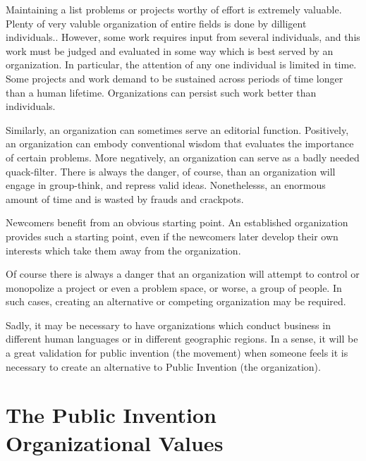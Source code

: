 \documentclass[
	fontsize=10pt, %
	twoside=false, %
	secnumdepth=1, %
]{kaobook}
\begin{document}
Maintaining a list problems or projects worthy of effort is extremely valuable.
Plenty of very valuble organization of entire fields is done by dilligent individuals..
However, some work requires input from several individuals, and this work must be judged and evaluated
in some way which is best served by an organization.
In particular, the attention of any one
individual is limited in time.
Some projects and work demand to be sustained across periods of time longer than a human lifetime.
Organizations can persist such work better than individuals.

Similarly, an organization can sometimes serve an editorial function.
Positively, an organization can embody conventional wisdom that
evaluates the importance of certain problems.
More negatively, an organization can serve as a badly needed quack-filter.
There is always the danger, of course, than an organization will engage in group-think,
and repress valid ideas.
Nonethelesss, an enormous amount of time and is wasted by frauds and crackpots.

Newcomers benefit from an obvious starting point.
An established organization provides such a starting point, even if the newcomers
later develop their own interests which take them away from the organization.

Of course there is always a danger that an organization will attempt to control or monopolize
a project or even a problem space, or worse, a group of people.
In such cases, creating an alternative or competing organization
may be required.

Sadly, it may be necessary to have organizations which conduct business in
different human languages or in different geographic regions.
In a sense, it will be a great validation for public invention (the movement) when
someone feels it is necessary to create an alternative to Public Invention (the organization).

\chapter{The Public Invention Organizational Values}
\end{document}
